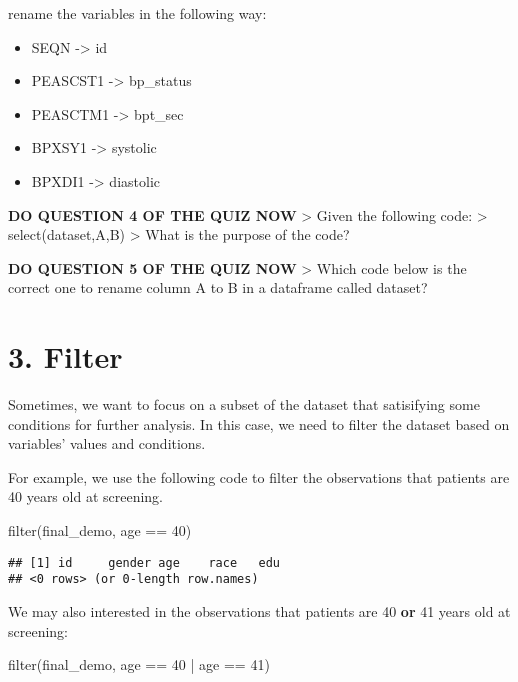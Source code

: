 \documentclass[
]{book}
\newenvironment{Shaded}{\begin{snugshade}}{\end{snugshade}}
\newcommand{\DecValTok}[1]{\textcolor[rgb]{0.00,0.00,0.81}{#1}}
\newcommand{\FunctionTok}[1]{\textcolor[rgb]{0.00,0.00,0.00}{#1}}
\newcommand{\NormalTok}[1]{#1}
\newcommand{\SpecialCharTok}[1]{\textcolor[rgb]{0.00,0.00,0.00}{#1}}
\providecommand{\tightlist}{%
  \setlength{\itemsep}{0pt}\setlength{\parskip}{0pt}}
\begin{document}
rename the variables in the following way:

\begin{itemize}
\tightlist
\item
  SEQN -\textgreater{} id
\item
  PEASCST1 -\textgreater{} bp\_status
\item
  PEASCTM1 -\textgreater{} bpt\_sec
\item
  BPXSY1 -\textgreater{} systolic
\item
  BPXDI1 -\textgreater{} diastolic
\end{itemize}

\textbf{DO QUESTION 4 OF THE QUIZ NOW}
\textgreater{} Given the following code:
\textgreater{} select(dataset,A,B)
\textgreater{} What is the purpose of the code?

\textbf{DO QUESTION 5 OF THE QUIZ NOW}
\textgreater{} Which code below is the correct one to rename column A to B in a dataframe called dataset?

\hypertarget{filter}{%
\section{3. Filter}\label{filter}}

Sometimes, we want to focus on a subset of the dataset that satisifying some conditions for further analysis. In this case, we need to filter the dataset based on variables' values and conditions.

For example, we use the following code to filter the observations that patients are 40 years old at screening.

\begin{Shaded}
\begin{Highlighting}[]
\FunctionTok{filter}\NormalTok{(final\_demo, age }\SpecialCharTok{==} \DecValTok{40}\NormalTok{)}
\end{Highlighting}
\end{Shaded}

\begin{verbatim}
## [1] id     gender age    race   edu   
## <0 rows> (or 0-length row.names)
\end{verbatim}

We may also interested in the observations that patients are 40 \textbf{or} 41 years old at screening:

\begin{Shaded}
\begin{Highlighting}[]
\FunctionTok{filter}\NormalTok{(final\_demo, age }\SpecialCharTok{==} \DecValTok{40} \SpecialCharTok{|}\NormalTok{ age }\SpecialCharTok{==} \DecValTok{41}\NormalTok{)}
\end{Highlighting}
\end{Shaded}
\end{document}
